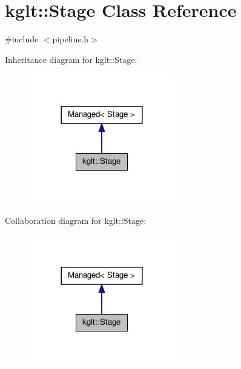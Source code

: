 \hypertarget{classkglt_1_1_stage}{\section{kglt\-:\-:Stage Class Reference}
\label{classkglt_1_1_stage}
}


{\ttfamily \#include $<$pipeline.\-h$>$}



Inheritance diagram for kglt\-:\-:Stage\-:\nopagebreak
\begin{figure}[H]
\begin{center}
\leavevmode
\includegraphics[width=180pt]{classkglt_1_1_stage__inherit__graph}
\end{center}
\end{figure}


Collaboration diagram for kglt\-:\-:Stage\-:\nopagebreak
\begin{figure}[H]
\begin{center}
\leavevmode
\includegraphics[width=180pt]{classkglt_1_1_stage__coll__graph}
\end{center}
\end{figure}
